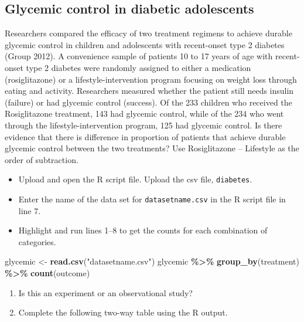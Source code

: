 \documentclass[
]{report}
\newenvironment{Shaded}{\begin{snugshade}}{\end{snugshade}}
\newcommand{\FunctionTok}[1]{\textcolor[rgb]{0.13,0.29,0.53}{\textbf{#1}}}
\newcommand{\NormalTok}[1]{#1}
\newcommand{\OtherTok}[1]{\textcolor[rgb]{0.56,0.35,0.01}{#1}}
\newcommand{\SpecialCharTok}[1]{\textcolor[rgb]{0.81,0.36,0.00}{\textbf{#1}}}
\newcommand{\StringTok}[1]{\textcolor[rgb]{0.31,0.60,0.02}{#1}}
\begin{document}
\subsection{Glycemic control in diabetic adolescents}\label{glycemic-control-in-diabetic-adolescents}

Researchers compared the efficacy of two treatment regimens to achieve durable glycemic control in children and adolescents with recent-onset type 2 diabetes (Group 2012). A convenience sample of patients 10 to 17 years of age with recent-onset type 2 diabetes were randomly assigned to either a medication (rosiglitazone) or a lifestyle-intervention program focusing on weight loss through eating and activity. Researchers measured whether the patient still needs insulin (failure) or had glycemic control (success). Of the 233 children who received the Rosiglitazone treatment, 143 had glycemic control, while of the 234 who went through the lifestyle-intervention program, 125 had glycemic control. Is there evidence that there is difference in proportion of patients that achieve durable glycemic control between the two treatments? Use Rosiglitazone -- Lifestyle as the order of subtraction.

\begin{itemize}
\item
  Upload and open the R script file. Upload the csv file, \texttt{diabetes}.
\item
  Enter the name of the data set for \texttt{datasetname.csv} in the R script file in line 7.
\item
  Highlight and run lines 1--8 to get the counts for each combination of categories.
\end{itemize}

\begin{Shaded}
\begin{Highlighting}[]
\NormalTok{glycemic }\OtherTok{\textless{}{-}} \FunctionTok{read.csv}\NormalTok{(}\StringTok{"datasetname.csv"}\NormalTok{)}
\NormalTok{glycemic }\SpecialCharTok{\%\textgreater{}\%} \FunctionTok{group\_by}\NormalTok{(treatment) }\SpecialCharTok{\%\textgreater{}\%} \FunctionTok{count}\NormalTok{(outcome)}
\end{Highlighting}
\end{Shaded}

\begin{enumerate}
\def\labelenumi{\arabic{enumi}.}
\item
  Is this an experiment or an observational study?
  \vspace{0.2in}
\item
  Complete the following two-way table using the R output.
\end{enumerate}
\end{document}
